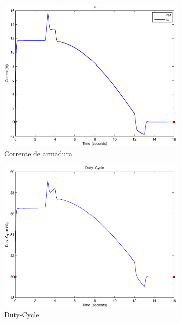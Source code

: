 \documentclass{article}
\begin{document}
\begin{figure}[H]
\begin{subfigure}{0.3\textwidth}
		\includegraphics[width=\linewidth]{matlab/ia4}
		\caption{Corrente de armadura}
	\end{subfigure}
	\begin{subfigure}{0.3\textwidth}
		\includegraphics[width=\linewidth]{matlab/d4}
		\caption{Duty-Cycle}
	\end{subfigure}
	\begin{subfigure}{0.3\textwidth}

\end{subfigure}
\end{figure}
\end{document}
